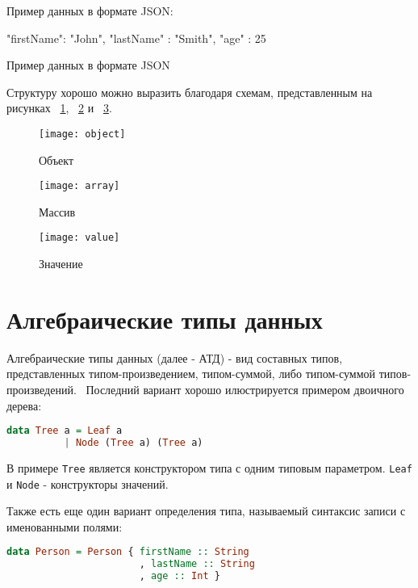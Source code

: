 \begin{ListingEnv}[H]
Пример данных в формате JSON:
\begin{Verb}
{     
    "firstName": "John",
    "lastName" : "Smith",
    "age" : 25
}
\end{Verb}
\caption{Пример данных в формате JSON}
\label{listing:jsonExample}
\end{ListingEnv}

Структуру хорошо можно выразить благодаря схемам, представленным на рисунках ~\ref{fig:objectGr}, ~\ref{fig:arrayGr} и ~\ref{fig:valueGr}.

\begin{figure}[!ht]
\centering
\texttt{[image: object]}
\caption{\label{fig:objectGr}Объект}
\end{figure}

\begin{figure}[!ht]
\centering
\texttt{[image: array]}
\caption{\label{fig:arrayGr}Массив}
\end{figure}

\begin{figure}[!ht]
\centering
\texttt{[image: value]}
\caption{\label{fig:valueGr}Значение}
\end{figure}

\section{Алгебраические типы данных}

Алгебраические типы данных (далее - АТД) - вид составных типов, представленных типом-произведением, типом-суммой, либо типом-суммой типов-произведений.~\cite{haskellGreatGood} Последний вариант хорошо илюстрируется примером двоичного дерева:

\begin{lstlisting}[language=Haskell]
data Tree a = Leaf a
          | Node (Tree a) (Tree a)
\end{lstlisting}

В примере \lstinline{Tree} является конструктором типа с одним типовым параметром. \lstinline{Leaf} и \lstinline{Node} - конструкторы значений. 

Также есть еще один вариант определения типа, называемый синтаксис записи с именованными полями:

\begin{lstlisting}[language=Haskell]
data Person = Person { firstName :: String
                       , lastName :: String
                       , age :: Int }
\end{lstlisting}

